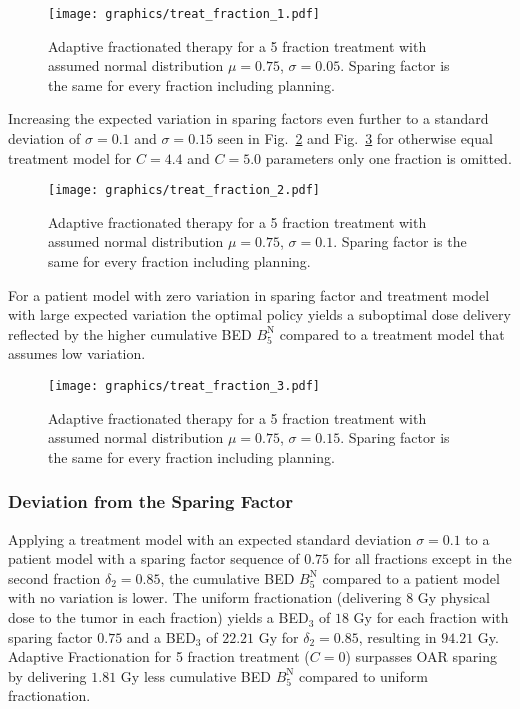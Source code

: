 \documentclass[\relativeRoot/ada.tex]{subfiles}
\begin{document}
\begin{figure}[!htb]
    \centering
    \texttt{[image: graphics/treat\_fraction\_1.pdf]}
    \caption{Adaptive fractionated therapy for a 5 fraction treatment with assumed normal distribution $\mu=0.75$, $\sigma=0.05$. Sparing factor is the same for every fraction including planning.}
    \label{fig:treat_fraction_1}
\end{figure}

Increasing the expected variation in sparing factors even further to a standard deviation of $\sigma=0.1$ and $\sigma=0.15$ seen in Fig.~\ref{fig:treat_fraction_2} and Fig.~\ref{fig:treat_fraction_3} for otherwise equal treatment model for $C=4.4$ and $C=5.0$ parameters only one fraction is omitted.

\begin{figure}[!htb]
    \centering
    \texttt{[image: graphics/treat\_fraction\_2.pdf]}
    \caption{Adaptive fractionated therapy for a 5 fraction treatment with assumed normal distribution $\mu=0.75$, $\sigma=0.1$. Sparing factor is the same for every fraction including planning.}
    \label{fig:treat_fraction_2}
\end{figure}

For a patient model with zero variation in sparing factor and treatment model with large expected variation the optimal policy yields a suboptimal dose delivery reflected by the higher cumulative BED $B_5^{\text{N}}$ compared to a treatment model that assumes low variation.

\begin{figure}[!htb]
    \centering
    \texttt{[image: graphics/treat\_fraction\_3.pdf]}
    \caption{Adaptive fractionated therapy for a 5 fraction treatment with assumed normal distribution $\mu=0.75$, $\sigma=0.15$. Sparing factor is the same for every fraction including planning.}
    \label{fig:treat_fraction_3}
\end{figure}

\subsubsection{Deviation from the Sparing Factor}

Applying a treatment model with an expected standard deviation $\sigma=0.1$ to a patient model with a sparing factor sequence of $0.75$ for all fractions except in the second fraction $\delta_2 = 0.85$, the cumulative BED $B_5^{\text{N}}$ compared to a patient model with no variation is lower. The uniform fractionation (delivering $8$ Gy physical dose to the tumor in each fraction) yields a BED$_3$ of $18$ Gy for each fraction with sparing factor $0.75$ and a BED$_3$ of $22.21$ Gy for $\delta_2=0.85$, resulting in $94.21$ Gy. Adaptive Fractionation for 5 fraction treatment ($C=0$) surpasses OAR sparing by delivering $1.81$ Gy less cumulative BED $B_5^{\text{N}}$ compared to uniform fractionation.
\end{document}
